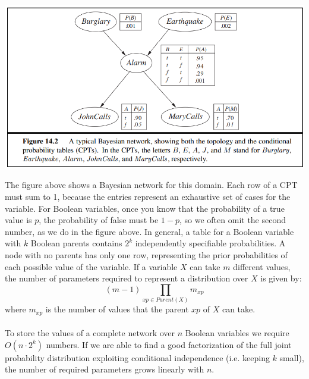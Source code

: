 \begin{center}
    \includegraphics[scale=0.9]{images/bayes-net-ex.png}
\end{center}
The figure above shows a Bayesian network for this domain.  Each row of a CPT must sum to 1, because the entries represent an exhaustive set of cases for the variable. For Boolean variables, once you know that the probability of a true value is $p$, the probability of false must be $1 - p$, so we often omit the second number, as we do in the figure above.  In general, a table for a Boolean variable with $k$ Boolean parents contains $2^k$ independently specifiable probabilities. A node with no parents has only one row, representing the prior probabilities of each possible value of the variable. If a variable $X$ can take $m$ different values, the number of parameters required to represent a distribution over $X$ is given by:
\[(m-1)\prod_{xp \in Parent(X)} m_{xp}\]
where $m_{xp}$ is the number of values that the parent $xp$ of $X$ can take.\\\\
To store the values of a complete network over $n$ Boolean variables we require $O(n \cdot 2^k)$ numbers. If we are able to find a good factorization of the full joint probability distribution exploiting conditional independence (i.e. keeping $k$ small), the number of required parameters grows linearly with $n$.

